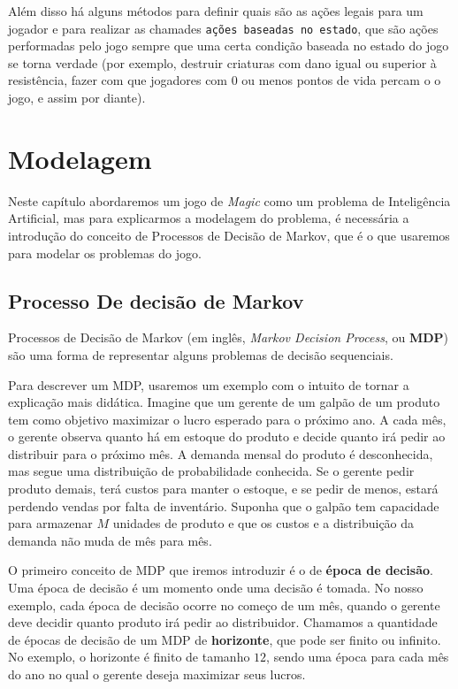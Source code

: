 \documentclass[dvipsnames]{book}
\begin{document}
Além disso há alguns métodos para definir quais são as ações legais para um jogador e para realizar
as chamades \texttt{ações baseadas no estado}, que são ações performadas pelo jogo sempre que uma
certa condição baseada no estado do jogo se torna verdade (por exemplo, destruir criaturas com dano
igual ou superior à resistência, fazer com que jogadores com $0$ ou menos pontos de vida percam o
o jogo, e assim por diante).

\newpage
\chapter{Modelagem}

Neste capítulo abordaremos um jogo de \textit{Magic} como um problema de Inteligência Artificial,
mas para explicarmos a modelagem do problema, é necessária a introdução do conceito de Processos
de Decisão de Markov, que é o que usaremos para modelar os problemas do jogo.

\section{Processo De decisão de Markov}
\label{ssec:mdp}

Processos de Decisão de Markov (em inglês, \textit{Markov Decision Process}, ou \textbf{MDP})
são uma forma de representar alguns problemas de decisão sequenciais.

Para descrever um MDP, usaremos um exemplo com o intuito de tornar a explicação mais didática.
Imagine que um gerente de um galpão de um produto tem como objetivo maximizar o lucro esperado
para o próximo ano. A cada mês, o gerente observa quanto há em estoque do produto e decide
quanto irá pedir ao distribuir para o próximo mês. A demanda mensal do produto é desconhecida,
mas segue uma distribuição de probabilidade conhecida. Se o gerente pedir produto demais, terá
custos para manter o estoque, e se pedir de menos, estará perdendo vendas por falta de inventário.
Suponha que o galpão tem capacidade para armazenar $M$ unidades de produto e que os custos e a
distribuição da demanda não muda de mês para mês.

O primeiro conceito de MDP que iremos introduzir é o de \textbf{época de decisão}. Uma época de
decisão é um momento onde uma decisão é tomada. No nosso exemplo, cada época de decisão ocorre
no começo de um mês, quando o gerente deve decidir quanto produto irá pedir ao distribuidor. Chamamos
a quantidade de épocas de decisão de um MDP de \textbf{horizonte}, que pode ser finito ou infinito.
No exemplo, o horizonte é finito de tamanho $12$, sendo uma época para cada mês do ano no qual o
gerente deseja maximizar seus lucros.
\end{document}
